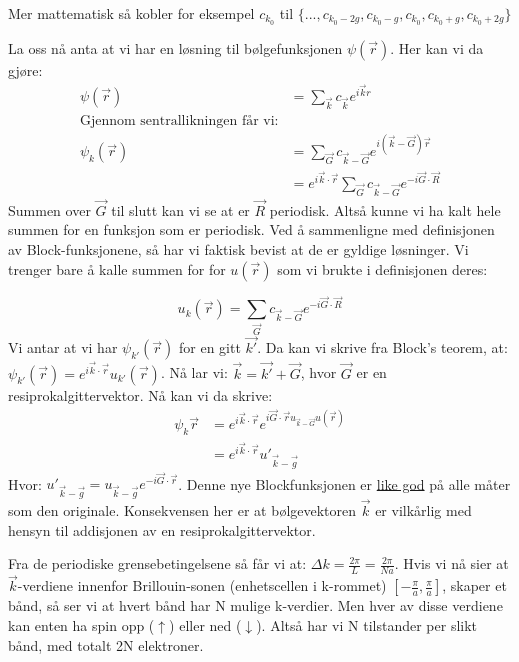 \documentclass{article}
\begin{document}
Mer mattematisk så kobler for eksempel $c_{k_0}$ til $\{..., c_{k_0 - 2g}, c_{k_0 - g}, c_{k_0}, c_{k_0 + g}, c_{k_0 + 2g}\}$

La oss nå anta at vi har en løsning til bølgefunksjonen $\psi(\vec{r})$.
Her kan vi da gjøre:
\begin{align*}
  \psi(\vec{r}) &= \sum_{\vec{k}} c_{\vec{k}} e^{i \vec{k} {r}} \\
  \text{Gjennom sentrallikningen får vi:} \\
   \psi_k(\vec{r})&= \sum_{\vec{G}} c_{\vec{k} - \vec{G}} e^{i(\vec{k} - \vec{G}) 
   \vec{r}} \\
   &= e^{i\vec{k}\cdot\vec{r}} \sum_{\vec{G}}  c_{\vec{k} - \vec{G}}e^{-i \vec{G}\cdot\vec{R}}
\end{align*}
Summen over $\vec{G}$ til slutt kan vi se at er $\vec{R}$ periodisk. Altså kunne vi ha kalt hele summen for en funksjon som er periodisk. Ved å sammenligne med definisjonen av Block-funksjonene, så har vi faktisk bevist at de er gyldige løsninger. Vi trenger bare å kalle summen for for $u(\vec{r})$ som vi brukte i definisjonen deres: 

\begin{equation*}
  u_k(\vec{r}) = \sum_{\vec{G}} c_{\vec{k} - \vec{G}} e^{-i \vec{G} \cdot \vec{R}}
\end{equation*}
Vi antar at vi har $\psi_{k'}(\vec{r})$ for en gitt $\vec{k'}$. Da kan vi skrive fra Block's teorem, at: $\psi_{k'}(\vec{r}) = e^{i\vec{k}\cdot\vec{r}} u_{k'}(\vec{r})$. Nå lar vi: $\vec{k} = \vec{k'} + \vec{G}$, hvor $\vec{G}$ er en resiprokalgittervektor. Nå kan vi da skrive:
\begin{align*}
  \psi_k{\vec{r}} &= e^{i \vec{k} \cdot \vec{r}} e^{i \vec{G} \cdot \vec{r} u_{\vec{k} - \vec{G}}u(\vec{r})} \\
  &= e^{i\vec{k}\cdot\vec{r}}{u'}_{\vec{k}-\vec{g}}
\end{align*}
Hvor: ${u'}_{\vec{k}-\vec{g}} = {u}_{\vec{k}-\vec{g}} e^{-i \vec{G}\cdot \vec{r}}$.
Denne nye Blockfunksjonen er \underline{like god} på alle måter som den originale. Konsekvensen her er at bølgevektoren $\vec{k}$ er vilkårlig med hensyn til addisjonen av en resiprokalgittervektor.

Fra de periodiske grensebetingelsene så får vi at: $\Delta k = \frac{2\pi}{L} = \frac{2\pi}{Na}$. Hvis vi nå sier at $\vec{k}$-verdiene innenfor  Brillouin-sonen (enhetscellen i k-rommet) $\left[-\frac{\pi}{a}, \frac{\pi}{a} \right]$, skaper et bånd, så ser vi at hvert bånd har N mulige k-verdier. Men hver av disse verdiene kan enten ha spin opp ($\uparrow$) eller ned ($\downarrow$). Altså har vi N tilstander per slikt bånd, med totalt 2N elektroner.
\end{document}
